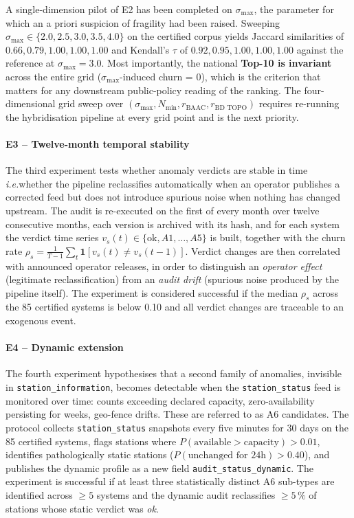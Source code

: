 \documentclass[a4paper,twoside]{article}
\newcommand{\ie}{\emph{i.e.}}
\begin{document}
A single-dimension pilot of E2 has been completed on
$\sigma_{\max}$, the parameter for which an a priori suspicion
of fragility had been raised. Sweeping
$\sigma_{\max} \in \{2.0, 2.5, 3.0, 3.5, 4.0\}$ on the certified
corpus yields Jaccard similarities of $0.66, 0.79, 1.00, 1.00,
1.00$ and Kendall's $\tau$ of $0.92, 0.95, 1.00, 1.00, 1.00$
against the reference at $\sigma_{\max} = 3.0$. Most importantly,
the national \textbf{Top-10 is invariant} across the entire grid
($\sigma_{\max}$-induced churn = 0), which is the criterion that
matters for any downstream public-policy reading of the ranking.
The four-dimensional grid sweep over
$(\sigma_{\max}, N_{\min}, r_{\text{BAAC}}, r_{\text{BD~TOPO}})$
requires re-running the hybridisation pipeline at every grid
point and is the next priority.

\paragraph{E3 -- Twelve-month temporal stability}
The third experiment tests whether anomaly verdicts are stable in
time \ie whether the pipeline reclassifies automatically when an
operator publishes a corrected feed but does not introduce
spurious noise when nothing has changed upstream. The audit is
re-executed on the first of every month over twelve consecutive
months, each version is archived with its hash, and for each
system the verdict time series
$v_s(t) \in \{\text{ok}, A1, \ldots, A5\}$ is built, together
with the churn rate
$\rho_s = \frac{1}{T-1}\sum_t \mathbf{1}[v_s(t) \neq v_s(t-1)]$.
Verdict changes are then correlated with announced operator
releases, in order to distinguish an \emph{operator effect}
(legitimate reclassification) from an \emph{audit drift}
(spurious noise produced by the pipeline itself). The experiment
is considered successful if the median $\rho_s$ across the 85
certified systems is below 0.10 and all verdict changes are
traceable to an exogenous event.

\paragraph{E4 -- Dynamic extension}
The fourth experiment hypothesises that a second family of
anomalies, invisible in \texttt{station\_information}, becomes
detectable when the \texttt{station\_status} feed is monitored
over time: counts exceeding declared capacity, zero-availability
persisting for weeks, geo-fence drifts. These are referred to as
A6 candidates. The protocol collects
\texttt{station\_status} snapshots every five minutes for 30 days
on the 85 certified systems, flags stations where
$P(\text{available} > \text{capacity}) > 0.01$, identifies
pathologically static stations
($P(\text{unchanged for 24h}) > 0.40$), and publishes the dynamic
profile as a new field \texttt{audit\_status\_dynamic}. The
experiment is successful if at least three statistically distinct
A6 sub-types are identified across $\ge 5$ systems and the
dynamic audit reclassifies $\ge 5\,\%$ of stations whose static
verdict was \emph{ok}.
\end{document}
